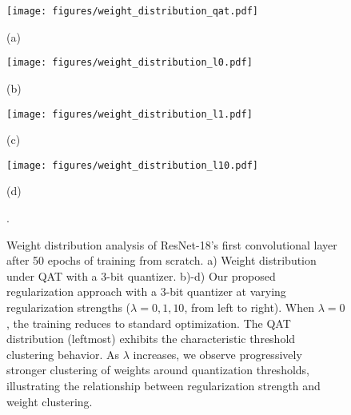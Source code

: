 \begin{figure*}[htb]
    \centering
    \begin{minipage}{0.245\textwidth}
    \centering
    \texttt{[image: figures/weight\_distribution\_qat.pdf]}
    
    (a)    
    \end{minipage}
    \begin{minipage}{0.245\textwidth}
    \centering
    \texttt{[image: figures/weight\_distribution\_l0.pdf]}
    
    (b)    
    \end{minipage}
    \begin{minipage}{0.245\textwidth}
    \centering
    \texttt{[image: figures/weight\_distribution\_l1.pdf]}
    
    (c)    
    \end{minipage}
    \begin{minipage}{0.245\textwidth}
    \centering
    \texttt{[image: figures/weight\_distribution\_l10.pdf]}
    
    (d)    
    \end{minipage}
    \caption{Weight distribution analysis of ResNet-18's first convolutional layer after 50 epochs of training from scratch. a) Weight distribution under QAT with a 3-bit quantizer. b)-d) Our proposed regularization approach with a 3-bit quantizer at varying regularization strengths ($\lambda=0, 1, 10$, from left to right). When $\lambda=0$, the training reduces to standard optimization. The QAT distribution (leftmost) exhibits the characteristic threshold clustering behavior. As $\lambda$ increases, we observe progressively stronger clustering of weights around quantization thresholds, illustrating the relationship between regularization strength and weight clustering.}.
    \label{fig:weight_distributions}
\end{figure*}

